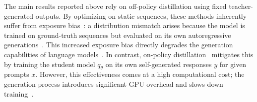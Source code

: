 \documentclass{article}
\theoremstyle{plain}
\theoremstyle{definition}
\theoremstyle{remark}
\begin{document}
\begin{table}[h]
    \centering
    \caption{\textbf{Comparison against on-policy methods (R-L score).} While on-policy methods give better results than off-policy, they usually suffer from slower training speed (see ~\cref{fig:speed_comparison_barplot}). \textsc{DistillLens} achieves competitive results efficiently, and further improves performance when combined with MiniLLM (Hybrid).}
    \label{tab:on_policy}
\end{table}


The main results reported above rely on off-policy distillation using fixed teacher-generated outputs. 
By optimizing on static sequences, these methods inherently suffer from exposure bias~\cite{arora2022exposure}: a distribution mismatch arises because the model is trained on ground-truth sequences but evaluated on its own autoregressive generations~\cite{gu2024minillm}. 
This increased exposure bias directly degrades the generation capabilities of language models~\cite{arora2022exposure}. 
In contrast, on-policy distillation~\cite{gu2024minillm,agarwal2024onpolicy} mitigates this by training the student model $q_\theta$ on its own self-generated responses $y$ for given prompts $x$. 
However, this effectiveness comes at a high computational cost; the generation process introduces significant GPU overhead and slows down training~\cite{ko2024distillm,kodistillm}.
\end{document}
